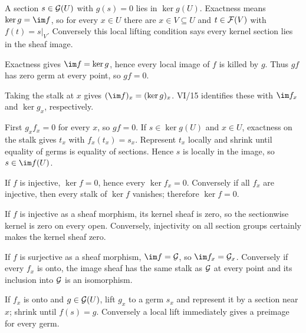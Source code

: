 \begin{solution}[Exercise VI.16.1]
A section $s\in\mathcal G(U)$ with $g(s)=0$ lies in $\ker g(U)$.  Exactness means $\ker g=\im f$, so for every $x\in U$ there are $x\in V\subseteq U$ and $t\in\mathcal F(V)$ with $f(t)=s|_V$.  Conversely this local lifting condition says every kernel section lies in the sheaf image.
\end{solution}

\begin{solution}[Exercise VI.16.2]
Exactness gives $\im f=\ker g$, hence every local image of $f$ is killed by $g$.  Thus $gf$ has zero germ at every point, so $gf=0$.
\end{solution}

\begin{solution}[Exercise VI.16.3]
Taking the stalk at $x$ gives $(\im f)_x=(\ker g)_x$.  VI/15 identifies these with $\im f_x$ and $\ker g_x$, respectively.
\end{solution}

\begin{solution}[Exercise VI.16.4]
First $g_xf_x=0$ for every $x$, so $gf=0$.  If $s\in\ker g(U)$ and $x\in U$, exactness on the stalk gives $t_x$ with $f_x(t_x)=s_x$.  Represent $t_x$ locally and shrink until equality of germs is equality of sections.  Hence $s$ is locally in the image, so $s\in\im f(U)$.
\end{solution}

\begin{solution}[Exercise VI.16.5]
If $f$ is injective, $\ker f=0$, hence every $\ker f_x=0$.  Conversely if all $f_x$ are injective, then every stalk of $\ker f$ vanishes; therefore $\ker f=0$.
\end{solution}

\begin{solution}[Exercise VI.16.6]
If $f$ is injective as a sheaf morphism, its kernel sheaf is zero, so the sectionwise kernel is zero on every open.  Conversely, injectivity on all section groups certainly makes the kernel sheaf zero.
\end{solution}

\begin{solution}[Exercise VI.16.7]
If $f$ is surjective as a sheaf morphism, $\im f=\G$, so $\im f_x=\G_x$.  Conversely if every $f_x$ is onto, the image sheaf has the same stalk as $\mathcal G$ at every point and its inclusion into $\mathcal G$ is an isomorphism.
\end{solution}

\begin{solution}[Exercise VI.16.8]
If $f_x$ is onto and $g\in\mathcal G(U)$, lift $g_x$ to a germ $s_x$ and represent it by a section near $x$; shrink until $f(s)=g$.  Conversely a local lift immediately gives a preimage for every germ.
\end{solution}

